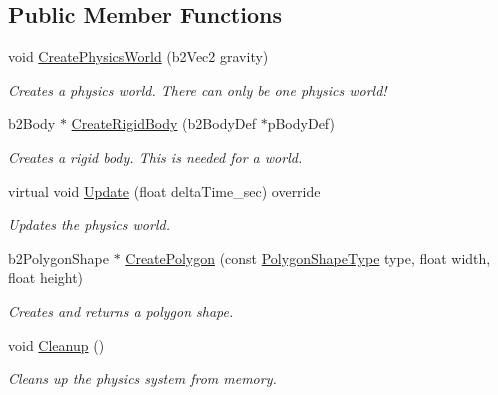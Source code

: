 \subsection*{Public Member Functions}
\begin{DoxyCompactItemize}
\item 
void \mbox{\hyperlink{class_physics_system_afa1b487619b6e9e1c16ec03fb9fd4270}{Create\+Physics\+World}} (b2\+Vec2 gravity)
\begin{DoxyCompactList}\small\item\em Creates a physics world. There can only be one physics world! \end{DoxyCompactList}\item 
b2\+Body $\ast$ \mbox{\hyperlink{class_physics_system_a6f1d9c9e9662f641332912172443376e}{Create\+Rigid\+Body}} (b2\+Body\+Def $\ast$p\+Body\+Def)
\begin{DoxyCompactList}\small\item\em Creates a rigid body. This is needed for a world. \end{DoxyCompactList}\item 
\mbox{\label{class_physics_system_aabb107eb3795556bff83099d7f3cb710}} 
virtual void \mbox{\hyperlink{class_physics_system_aabb107eb3795556bff83099d7f3cb710}{Update}} (float delta\+Time\+\_\+sec) override
\begin{DoxyCompactList}\small\item\em Updates the physics world. \end{DoxyCompactList}\item 
b2\+Polygon\+Shape $\ast$ \mbox{\hyperlink{class_physics_system_a651f848a76752bfb3f69e99a3a908865}{Create\+Polygon}} (const \mbox{\hyperlink{class_physics_system_ac3b7ef40b19864e4ecdec88af3420a89}{Polygon\+Shape\+Type}} type, float width, float height)
\begin{DoxyCompactList}\small\item\em Creates and returns a polygon shape. \end{DoxyCompactList}\item 
\mbox{\label{class_physics_system_a19f4322c3ffe4c8ba2077dcc638e8039}} 
void \mbox{\hyperlink{class_physics_system_a19f4322c3ffe4c8ba2077dcc638e8039}{Cleanup}} ()
\begin{DoxyCompactList}\small\item\em Cleans up the physics system from memory. \end{DoxyCompactList}\item 

\end{DoxyCompactItemize}
